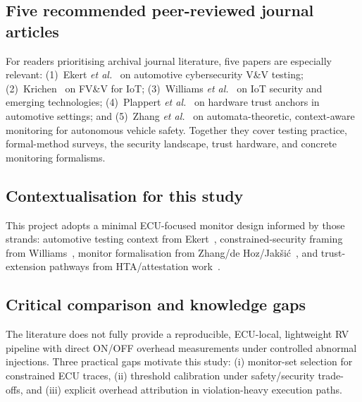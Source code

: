 \subsection{Five recommended peer-reviewed journal articles}

For readers prioritising archival journal literature, five papers are especially relevant: (1)~Ekert \textit{et al.}~\cite{ekert2021cybersecurity} on automotive cybersecurity V\&V testing; (2)~Krichen~\cite{krichen2023survey} on FV\&V for IoT; (3)~Williams \textit{et al.}~\cite{williams2022survey} on IoT security and emerging technologies; (4)~Plappert \textit{et al.}~\cite{plappert2023hta} on hardware trust anchors in automotive settings; and (5)~Zhang \textit{et al.}~\cite{zhang2024context} on automata-theoretic, context-aware monitoring for autonomous vehicle safety. Together they cover testing practice, formal-method surveys, the security landscape, trust hardware, and concrete monitoring formalisms.

\subsection{Contextualisation for this study}

This project adopts a minimal ECU-focused monitor design informed by those strands: automotive testing context from Ekert~\cite{ekert2021cybersecurity}, constrained-security framing from Williams~\cite{williams2022survey}, monitor formalisation from Zhang/de Hoz/Jak\v{s}i\'c~\cite{zhang2024context,dehoz2022iotdt,jaksic2018algebraic}, and trust-extension pathways from HTA/attestation work~\cite{plappert2023hta,lorych2024hta}.

\subsection{Critical comparison and knowledge gaps}

The literature does not fully provide a reproducible, ECU-local, lightweight RV pipeline with direct ON/OFF overhead measurements under controlled abnormal injections. Three practical gaps motivate this study: (i) monitor-set selection for constrained ECU traces, (ii) threshold calibration under safety/security trade-offs, and (iii) explicit overhead attribution in violation-heavy execution paths.
